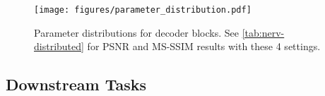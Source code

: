 \documentclass[10pt,twocolumn,letterpaper]{article}
\begin{document}
\begin{table}[t!]
\centering
\caption{Analysis of parameter rebalancing.}
\label{tab:nerv-distributed}
    \vspace{-0.5em}
\end{table}

\begin{figure}[t!]
    \centering
    \texttt{[image: figures/parameter\_distribution.pdf]}
    \vspace{-0.5em}
    \caption{Parameter distributions for decoder blocks. See \cref{tab:nerv-distributed} for PSNR and MS-SSIM results with these 4 settings.}
    \label{fig:decoder-param-distribution}
    \vspace{-1em}
\end{figure}

\subsection{Downstream Tasks}
\label{subsec:downstream-tasks}
\end{document}
